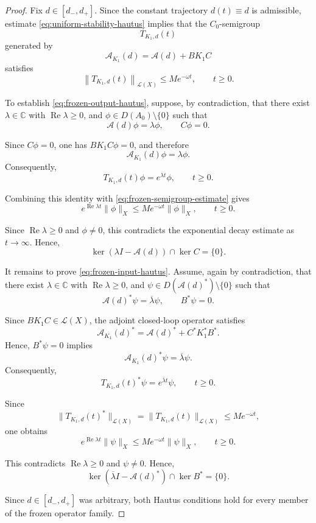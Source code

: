 \documentclass[pdflatex,sn-mathphys-num]{sn-jnl}
\theoremstyle{thmstyleone}%
\theoremstyle{thmstyletwo}%
\theoremstyle{thmstylethree}%
\begin{document}
\begin{proof}

Fix \(d\in[d_-,d_+]\). Since the constant trajectory \(d(t)\equiv d\) is admissible, estimate \eqref{eq:uniform-stability-hautus} implies that the \(C_0\)-semigroup
\[
T_{K_1,d}(t)
\]
generated by
\[
\mathcal A_{K_1}(d)
=
\mathcal A(d)+BK_1C
\]
satisfies
\begin{equation}
\left\|
T_{K_1,d}(t)
\right\|_{\mathcal L(X)}
\le
Me^{-\omega t},
\qquad
t\ge0.
\label{eq:frozen-semigroup-estimate}
\end{equation}

To establish \eqref{eq:frozen-output-hautus}, suppose, by contradiction, that there exist \(\lambda\in\mathbb C\) with
\(\operatorname{Re}\lambda\ge0\),
and
\(\phi\in D(A_0)\setminus\{0\}\)
such that
\[
\mathcal A(d)\phi
=
\lambda\phi,
\qquad
C\phi=0.
\]

Since \(C\phi=0\), one has \(BK_1C\phi=0\), and therefore
\[
\mathcal A_{K_1}(d)\phi
=
\lambda\phi.
\]
Consequently,
\[
T_{K_1,d}(t)\phi
=
e^{\lambda t}\phi,
\qquad
t\ge0.
\]

Combining this identity with
\eqref{eq:frozen-semigroup-estimate}
gives
\[
e^{\operatorname{Re}\lambda t}
\|\phi\|_X
\le
Me^{-\omega t}
\|\phi\|_X,
\qquad
t\ge0.
\]

Since \(\operatorname{Re}\lambda\ge0\)
and
\(\phi\neq0\), this contradicts the exponential decay estimate as \(t\to\infty\). Hence,
\[
\ker(\lambda I-\mathcal A(d))
\cap
\ker C
=
\{0\}.
\]

It remains to prove \eqref{eq:frozen-input-hautus}.
Assume, again by contradiction, that there exist \(\lambda\in\mathbb C\) with
\(\operatorname{Re}\lambda\ge0\),
and \(\psi\in D(\mathcal A(d)^*)\setminus\{0\}\)
such that
\[
\mathcal A(d)^*\psi
=
\overline{\lambda}\psi,
\qquad
B^*\psi=0.
\]

Since \(BK_1C\in\mathcal L(X)\),
the adjoint closed-loop operator satisfies
\[
\mathcal A_{K_1}(d)^*
=
\mathcal A(d)^*
+
C^*K_1^*B^*.
\]
Hence,
\(B^*\psi=0\)
implies
\[
\mathcal A_{K_1}(d)^*\psi
=
\overline{\lambda}\psi.
\]
Consequently,
\[
T_{K_1,d}(t)^*\psi
=
e^{\overline{\lambda}t}\psi,
\qquad
t\ge0.
\]

Since
\[
\|T_{K_1,d}(t)^*\|_{\mathcal L(X)}
=
\|T_{K_1,d}(t)\|_{\mathcal L(X)}
\le
Me^{-\omega t},
\]
one obtains
\[
e^{\operatorname{Re}\lambda t}
\|\psi\|_X
\le
Me^{-\omega t}
\|\psi\|_X,
\qquad
t\ge0.
\]

This contradicts
\(\operatorname{Re}\lambda\ge0\)
and
\(\psi\neq0\).
Hence,
\[
\ker(\overline{\lambda}I-\mathcal A(d)^*)
\cap
\ker B^*
=
\{0\}.
\]

Since \(d\in[d_-,d_+]\) was arbitrary, both Hautus conditions hold for every member of the frozen operator family.

\end{proof}
\end{document}
